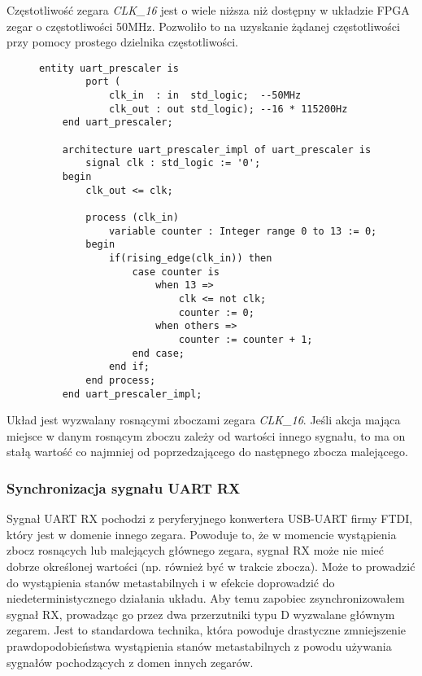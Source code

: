 Częstotliwość zegara \textit{CLK\_16} jest o wiele niższa niż dostępny w układzie FPGA zegar o częstotliwości 50MHz. Pozwoliło to na uzyskanie żądanej częstotliwości przy pomocy prostego dzielnika częstotliwości.

\begin{figure}[!h]
	\begin{lstlisting}[style=vhdl, caption=Dzielnik częstotliwości, captionpos=b]
	entity uart_prescaler is
		port (
			clk_in  : in  std_logic;  --50MHz
			clk_out : out std_logic); --16 * 115200Hz
	end uart_prescaler;
	
	architecture uart_prescaler_impl of uart_prescaler is
		signal clk : std_logic := '0';
	begin
		clk_out <= clk;
		
		process (clk_in) 
			variable counter : Integer range 0 to 13 := 0;
		begin	
			if(rising_edge(clk_in)) then
				case counter is
					when 13 =>
						clk <= not clk;
						counter := 0;
					when others =>
						counter := counter + 1;
				end case;
			end if;
		end process;
	end uart_prescaler_impl;
	\end{lstlisting}
\end{figure}

Układ jest wyzwalany rosnącymi zboczami zegara \textit{CLK\_16}. Jeśli akcja mająca miejsce w danym rosnącym zboczu zależy od wartości innego sygnału, to ma on stałą wartość co najmniej od poprzedzającego do następnego zbocza malejącego.


\subsubsection{Synchronizacja sygnału UART RX}
\label{uart-sync}
Sygnał UART RX pochodzi z peryferyjnego konwertera USB-UART firmy FTDI, który jest w domenie innego zegara. Powoduje to, że w momencie wystąpienia zbocz rosnących lub malejących głównego zegara, sygnał RX może nie mieć dobrze określonej wartości (np. również być w trakcie zbocza). Może to prowadzić do wystąpienia stanów metastabilnych \cite{altera-metastability} i w efekcie doprowadzić do niedeterministycznego działania układu. Aby temu zapobiec zsynchronizowałem sygnał RX, prowadząc go przez dwa przerzutniki typu D \cite{altera-metastability, 2ff-synchronization} wyzwalane głównym zegarem. Jest to standardowa technika, która powoduje drastyczne zmniejszenie prawdopodobieństwa wystąpienia stanów metastabilnych z powodu używania sygnałów pochodzących z domen innych zegarów.

% 
% 
% 
% 

% 
% 
% 




\newpage